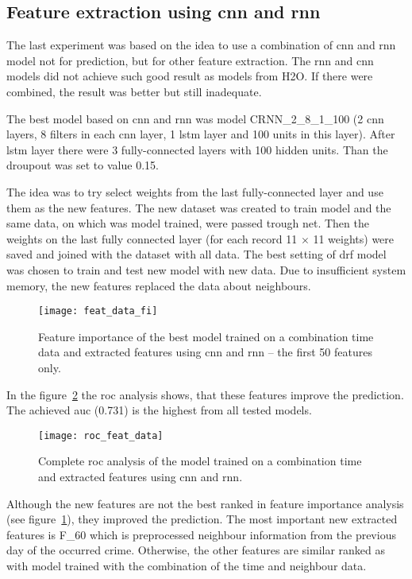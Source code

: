 \documentclass[thesis=M,english]{FITthesis}[2012/10/20]
\begin{document}
\subsection{Feature extraction using \gls{cnn} and \gls{rnn}}

The last experiment was based on the idea to use a combination of \gls{cnn} and \gls{rnn} model not for prediction, but for other feature extraction. The \gls{rnn} and \gls{cnn} models did not achieve such good result as models from H2O. If there were combined, the result was better but still inadequate. 

The best model based on \gls{cnn} and \gls{rnn} was model CRNN\_2\_8\_1\_100 (2 \gls{cnn} layers, 8 filters in each \gls{cnn} layer, 1 \gls{lstm} layer and 100 units in this layer). After \gls{lstm} layer there were 3 fully-connected layers with 100 hidden units. Than the droupout was set to value 0.15. 

The idea was to try select weights from the last fully-connected layer and use them as the new features. The new dataset was created to train model and the same data, on which was model trained, were passed trough net. Then the weights on the last fully connected layer (for each record 11 $\times$ 11 weights) were saved and joined with the dataset with all data.  The best setting of \gls{drf} model was chosen to train and test new model with new data. Due to insufficient system memory, the new features replaced the data about neighbours. 

\begin{figure}[ht]\centering
    \texttt{[image: feat\_data\_fi]}\label{fig:roc_fe_fi}
    \caption{Feature importance of the best model trained on a combination time data and extracted features using \gls{cnn} and \gls{rnn} -- the first 50 features only.}
\end{figure}

In the figure~\ref{fig:roc_fe_best} the \gls{roc} analysis shows, that these features improve the prediction. The achieved \gls{auc} (0.731) is the highest from all tested models. 

\begin{figure}[ht]\centering
    \texttt{[image: roc\_feat\_data]}\label{fig:roc_fe_best}
    \caption{Complete \gls{roc} analysis of the model trained on a combination time and extracted features using \gls{cnn} and \gls{rnn}.}
\end{figure}

Although the new features are not the best ranked in feature importance analysis (see figure~\ref{fig:roc_fe_fi}), they improved the prediction. The most important new extracted features is F\_60 which is preprocessed neighbour information from the previous day of the occurred crime. Otherwise, the other features are similar ranked as with model trained with the combination of the time and neighbour data.
\end{document}
